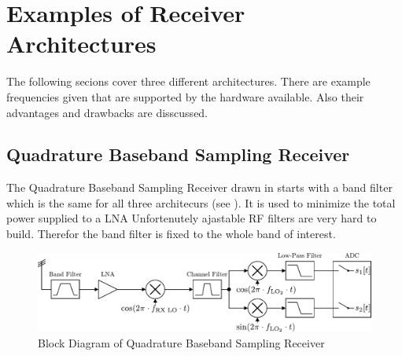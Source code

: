 \section{Examples of Receiver Architectures}
The following secions cover three different architectures. There are example
frequencies given that are supported by the hardware available. Also their
advantages and drawbacks are disscussed. \\

\subsection{Quadrature Baseband Sampling Receiver}
\label{sec:rx_0}

The Quadrature Baseband Sampling Receiver drawn in 
starts with a band filter which is the same for all three architecurs
(see ).
It is used to minimize the total power supplied to a \gls{LNA}
Unfortenutely ajastable \gls{RF} filters are very hard to build. Therefor
the band filter is fixed to the whole band of interest. \\


\begin{figure}[ht]
  \centering
  \includegraphics[width=\textwidth]{figures/rx_0_bd}
  \caption{Block Diagram of Quadrature Baseband Sampling Receiver}
  \label{fig:rx_0_bd}
\end{figure}

